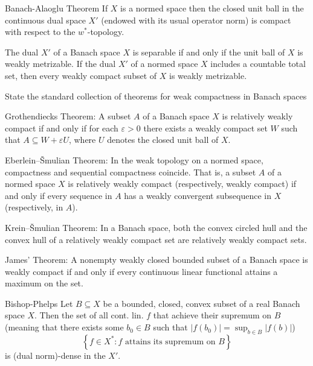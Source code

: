 Banach-Alaoglu Theorem
If \( X \) is a normed space then the closed unit ball in the continuous dual space \( X' \)
(endowed with its usual operator norm) is compact with respect to the \( w^\ast \)-topology.

The dual \( X' \) of a Banach space \( X \) is separable if and only if the unit ball of \( X \) is weakly metrizable.
If the dual \( X' \) of a normed space \( X \) includes a countable total set, then every weakly compact subset of \( X \) is weakly metrizable.


State the standard collection of theorems for weak compactness in Banach spaces

Grothendiecks Theorem:
A subset \( A \) of a Banach space \( X \) is relatively weakly compact if and only if for each \( \varepsilon > 0 \) 
there exists a weakly compact set \( W \) such that \( A \subseteq W + \varepsilon U \), where \( U \) denotes the closed unit ball of \( X \).

Eberlein–Šmulian Theorem:
In the weak topology on a normed space, compactness and sequential compactness coincide. 
That is, a subset \(A\) of a normed space \(X\) is relatively weakly compact (respectively, weakly compact) 
if and only if every sequence in \(A\) has a weakly convergent subsequence in \(X\) (respectively, in \(A\)).

Krein–Šmulian Theorem:
In a Banach space, both the convex circled hull and the convex hull of a relatively weakly compact set are relatively weakly compact sets.

James' Theorem:
A nonempty weakly closed bounded subset of a Banach space is weakly compact if and only if 
every continuous linear functional attains a maximum on the set.


Bishop-Phelps
Let \(B \subseteq X\) be a bounded, closed, convex subset of a real Banach space \(X.\) 
Then the set of all cont. lin. \(f\) that achieve their supremum on \(B\) 
(meaning that there exists some \(b_0 \in B\) such that \(|f(b_0)| = \sup_{b \in B} |f(b)|\)) 
\[
\left\{f \in X^* : f \text{ attains its supremum on } B\right\} 
\]
is (dual norm)-dense in the \( X' \).
